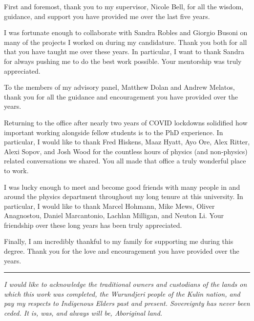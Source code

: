 \begin{acknowledgements}

  First and foremost, thank you to my supervisor, Nicole Bell, for all the wisdom, guidance, and support you have provided me over the last five years. 

  I was fortunate enough to collaborate with Sandra Robles and Giorgio Busoni on many of the projects I worked on during my candidature. Thank you both for all that you have taught me over these years. In particular, I want to thank Sandra for always pushing me to do the best work possible. Your mentorship was truly appreciated.

  To the members of my advisory panel, Matthew Dolan and Andrew Melatos, thank you for all the guidance and encouragement you have provided over the years.

  Returning to the office after nearly two years of COVID lockdowns solidified how important working alongside fellow students is to the PhD experience. In particular, I would like to thank Fred Hiskens, Maaz Hyatt, Ayo Ore, Alex Ritter, Alexi Sopov, and Josh Wood for the countless hours of physics (and non-physics) related conversations we shared. You all made that office a truly wonderful place to work.
 
  I was lucky enough to meet and become good friends with many people in and around the physics department throughout my long tenure at this university. In particular, I would like to thank Marcel Hohmann, Mike Mews, Oliver Anagnostou, Daniel Marcantonio, Lachlan Milligan, and Neuton Li. Your friendship over these long years has been truly appreciated.

  Finally, I am incredibly thankful to my family for supporting me during this degree. Thank you for the love and encouragement you have provided over the years. 

  \vfill
  \noindent\rule{\textwidth}{0.5pt}
  \textit{I would like to acknowledge the traditional owners and custodians of the lands on which this work was completed, the Wurundjeri people of the Kulin nation, and pay my respects to Indigenous Elders past and present. Sovereignty has never been ceded. It is, was, and always will be, Aboriginal land.}
\end{acknowledgements}
